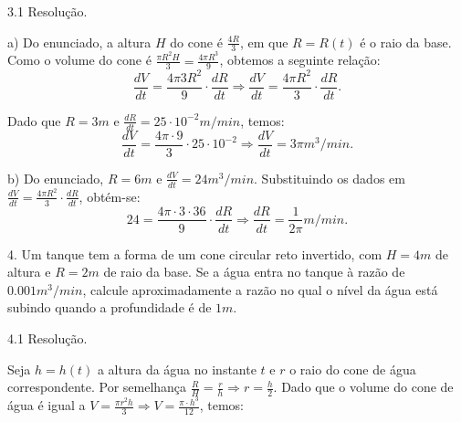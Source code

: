\documentclass{article}
\begin{document}
{\begin{newpage}
\par
\vspace{0.3cm}
\begin{flushleft}
3.1 Resolução.
\end{flushleft}
\par a) Do enunciado, a altura $H$ do cone é $\displaystyle{\frac{4R}{3}}$, em que $R=R(t)$ é o raio da base. Como o volume do cone é $\displaystyle{\frac{\pi R^{2}H}{3} = \frac{4\pi R^{3}}{9}}$, obtemos a seguinte relação:
\begin{equation*} \displaystyle{\frac{dV}{dt} = \frac{4\pi 3R^{2}}{9}\cdot\frac{dR}{dt} \Rightarrow \frac{dV}{dt} = \frac{4\pi R^2}{3}\cdot\frac{dR}{dt}}. \end{equation*}
\par Dado que $R = 3m$ e $\displaystyle{\frac{dR}{dt} = 25\cdot 10^{-2}m/min}$, temos:
\begin{equation*} \displaystyle{\frac{dV}{dt} = \frac{4\pi\cdot 9}{3}\cdot 25\cdot 10^{-2} \Rightarrow \frac{dV}{dt} = 3\pi m^{3}/min}.\end{equation*}
\vspace{0.2cm}
\par b) Do enunciado, $R=6m$ e $\displaystyle{\frac{dV}{dt} = 24m^{3}/min}.$ Substituindo os dados em $\displaystyle{\frac{dV}{dt} = \frac{4\pi R^2}{3}\cdot\frac{dR}{dt}}$, obtém-se:
\begin{equation*}\displaystyle{24 = \frac{4\pi\cdot 3\cdot 36}{9}\cdot\frac{dR}{dt} \Rightarrow \frac{dR}{dt} = \frac{1}{2\pi }m/min}.\end{equation*}
\par
\vspace{0.3cm}
\begin{flushleft}
4. Um tanque tem a forma de um cone circular reto invertido, com $H=4m$ de altura e $R=2m$ de raio da base. Se a água entra no tanque à razão de $0.001m^{3}/min$, calcule aproximadamente a razão no qual o nível da água está subindo quando a profundidade é de $1m$. 
\end{flushleft}
\par
\vspace{0.3cm}
\begin{flushleft}
4.1 Resolução.
\end{flushleft}
\par Seja $h=h(t)$ a altura da água no instante $t$ e $r$ o raio do cone de água correspondente. Por semelhança $\displaystyle{\frac{R}{H} = \frac{r}{h} \Rightarrow r=\frac{h}{2}}.$ Dado que o volume do cone de água é igual a $\displaystyle{V = \frac{\pi r^{2}h}{3} \Rightarrow V=\frac{\pi\cdot h^3}{12}}$, temos:

\end{newpage}}
\end{document}
